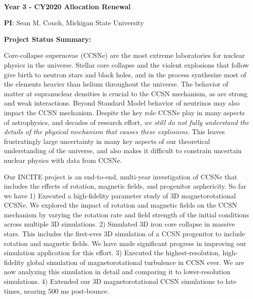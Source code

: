 \documentclass[12pt,letterpaper]{article}
\begin{document}
\setlength{\parindent}{0in}

\pagestyle{fancy}
\renewcommand{\headrulewidth}{0.0pt}

\begin{center} \textbf{\doctitle{}} \\
{\bf Year 3 - CY2020 Allocation Renewal } \vspace{-0.1in}

\end{center}

\begin{flushleft}
\textbf{PI}:
Sean M. Couch, Michigan State University \\
\medskip

\textbf{Project Status Summary:}

{\parindent 16pt

Core-collapse supernovae (CCSNe) are the most extreme laboratories for nuclear physics in the universe.
Stellar core collapse and the violent explosions that follow give birth to neutron stars and black holes, and in the process synthesize most of the elements heavier than helium throughout the universe.
The behavior of matter at supranuclear densities is crucial to the CCSN mechanism, as are strong and weak interactions.
Beyond Standard Model behavior of neutrinos may also impact the CCSN mechanism.
Despite the key role CCSNe play in many aspects of astrophysics, and decades of research effort, {\it we still do not fully understand the details of the physical mechanism that causes these explosions.}
This leaves frustratingly large uncertainty in many key aspects of our theoretical understanding of the universe, and also makes it difficult to constrain uncertain nuclear physics with data from CCSNe.

Our INCITE project is an end-to-end, multi-year investigation of CCSNe that includes the effects of rotation, magnetic fields, and progenitor asphericity.
So far we have 
1) Executed a high-fidelity parameter study of 3D magnetorotational CCSNe. We explored the impact of rotation and magnetic fields on the CCSN mechanism by varying the rotation rate and field strength of the initial conditions across multiple 3D simulations. 
2) Simulated 3D iron core collapse in massive stars. This  includes the first-ever 3D simulation of a CCSN progenitor to include rotation and magnetic fields. We have made significant progress in improving our simulation application for this effort.
3) Executed the highest-resolution, high-fidelity global simulation of magnetorotational turbulence in CCSN ever. We are now analyzing this simulation in detail and comparing it to lower-resolution simulations.
4) Extended our 3D magnetorotational CCSN simulations to late times, nearing 500 ms post-bounce. 

}
\end{flushleft}
\end{document}
